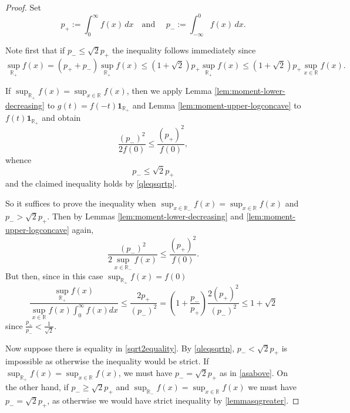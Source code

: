 \documentclass{article}
\theoremstyle{plain}
\theoremstyle{definition}
\newcommand{\1}{\mathbf 1}
\begin{document}
\begin{proof}

Set
\[
        p_{+}:=\int_0^\infty f(x)\,dx
        \quad \text{and } \quad
        p_{-}:=\int_{-\infty}^0 f(x)\,dx.
\]

Note first that if $p_{-}\leq \sqrt{2} p_{+}$ the inequality follows immediately since 
\begin{equation} \label{qleqsqrtp}
    \sup_{\mathbb R_+} f(x)=(p_{+}+p_{-})\sup_{\mathbb R_+} f(x) \leq (1+\sqrt2)p_{+} \sup_{\mathbb R_+} f(x) \leq (1+\sqrt2)p_{+} \sup_{x\in \mathbb R} f(x).
\end{equation}

If $\sup_{\mathbb R_+} f(x) = \sup_{x\in \mathbb R} f(x)$, then we apply Lemma \ref{lem:moment-lower-decreasing} to $g(t) = f(-t)\mathbf 1_{\mathbb R_+}$ and Lemma \ref{lem:moment-upper-logconcave} to $f(t) \mathbf 1_{\mathbb R_+}$ and obtain 
$$
\frac{(p_{-})^{2}}{2f(0)}\leq \frac{(p_{+})^{2}}{f(0)},
$$
whence 
\begin{equation} \label{asabove}
    p_{-} \leq \sqrt{2}p_{+}
\end{equation}
and the claimed inequality holds by \eqref{qleqsqrtp}. 

So it suffices to prove the inequality when $\sup_{x \in \mathbb R_-}f(x) = \sup_{x \in \mathbb R}f(x)$ and $p_{-} > \sqrt2 p_{+}.$ Then by Lemmas \ref{lem:moment-lower-decreasing} and \ref{lem:moment-upper-logconcave} again, 
\begin{equation} \label{lemmasqgreater}
\frac{(p_{-})^{2}}{2\sup_{x \in \mathbb R_-}f(x)}\leq \frac{(p_{+})^{2}}{f(0)}.
\end{equation}
But then, since in this case $\sup_{\mathbb R_+} f(x) = f(0)$
$$
\frac{\sup_{\mathbb R_+} f(x)}{\sup_{x \in \mathbb R}f(x) \int_0^{\infty}f(x)dx}\leq \frac{2p_{+}}{(p_{-})^{2}} = (1+\frac{p_{-}}{p_{+}})\frac{2(p_{+})^{2}}{(p_{-})^{2}} \leq 1+\sqrt{2}
$$
since $\frac{p_{+}}{p_{-}} < \frac{1}{\sqrt{2}}.$ %

Now suppose there is equality in \eqref{sqrt2equality}. By \eqref{qleqsqrtp}, $p_{-}<\sqrt2 p_{+} $ is impossible as otherwise the inequality would be strict. If $\sup_{\mathbb R_+} f(x) = \sup_{x\in \mathbb R} f(x)$, we must have $p_{-} = \sqrt{2}p_{+}$ as in \eqref{asabove}. On the other hand, if $p_{-} \geq \sqrt 2  p_{+}$ and $\sup_{\mathbb R_-} f(x) = \sup_{x\in \mathbb R} f(x)$ we must have $p_{-} = \sqrt{2}p_{+}$, as otherwise we would have strict inequality by \eqref{lemmasqgreater}. 


\end{proof}
\end{document}
